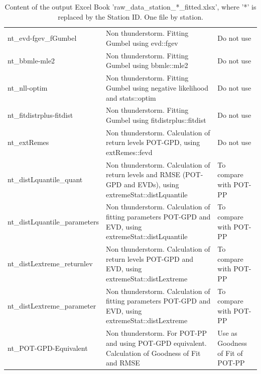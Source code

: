 \documentclass[12pt,twoside]{reedthesis}
\begin{document}
\begingroup\fontsize{8}{10}\selectfont
\begin{longtable}[t]{>{\raggedright\arraybackslash}p{1.5in}>{\raggedright\arraybackslash}p{3in}>{\raggedright\arraybackslash}p{1.5in}}
\caption[Content of raw\_data\_station\_*\_fitted.xlsx]{\label{tab:rawdatastationidfitted}Content of the output Excel Book 'raw\_data\_station\_*\_fitted.xlsx', where '*' is replaced by the Station ID. One file by station.}\\
\toprule
\multicolumn{1}{l}{Excel Sheet Name} & \multicolumn{1}{l}{Description} & \multicolumn{1}{l}{Important}\\
\midrule
nt\_evd-fgev\_fGumbel & Non thunderstorm. Fitting Gumbel using evd::fgev & Do not use\\
nt\_bbmle-mle2 & Non thunderstorm. Fitting Gumbel using bbmle::mle2 & Do not use\\
nt\_nll-optim & Non thunderstorm. Fitting Gumbel using negative likelihood and stats::optim & Do not use\\
nt\_fitdistrplus-fitdist & Non thunderstorm. Fitting Gumbel using fitdistrplus::fitdist & Do not use\\
nt\_extRemes & Non thunderstorm. Calculation of return levels POT-GPD, using extRemes::fevd & Do not use\\
nt\_distLquantile\_quant & Non thunderstorm. Calculation of return levels and RMSE (POT-GPD and EVDs), using extremeStat::distLquantile & To compare with POT-PP\\
nt\_distLquantile\_parameters & Non thunderstorm. Calculation of fitting parameters POT-GPD and EVD, using extremeStat::distLquantile & To compare with POT-PP\\
nt\_distLextreme\_returnlev & Non thunderstorm. Calculation of return levels POT-GPD and EVD, using extremeStat::distLextreme & To compare with POT-PP\\
nt\_distLextreme\_parameter & Non thunderstorm. Calculation of fitting parameters POT-GPD and EVD, using extremeStat::distLextreme & To compare with POT-PP\\
nt\_POT-GPD-Equivalent & Non thunderstorm. For POT-PP and using POT-GPD equivalent. Calculation of Goodness of Fit and RMSE & Use as Goodness of Fit of POT-PP\\
\bottomrule
\end{longtable}
\endgroup{}
\end{document}
